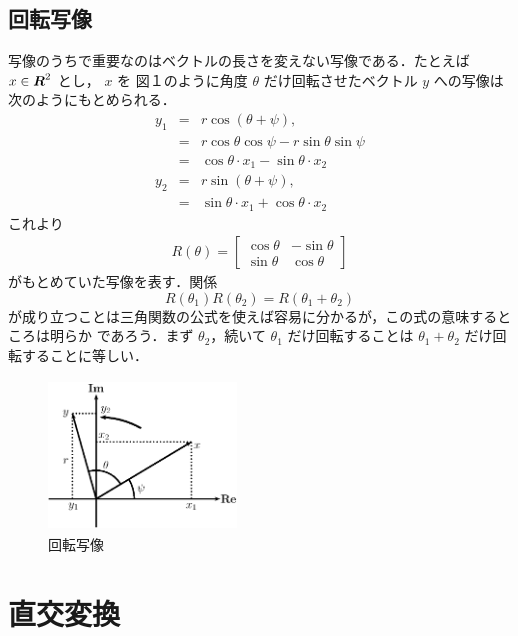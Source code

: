 \documentclass[a4paper,12pt]{jarticle}
\newcommand{\vect}[1]{\mbox{\boldmath${#1}$}}
\begin{document}
\subsection{回転写像}
写像のうちで重要なのはベクトルの長さを変えない写像である．たとえば $x \in \vect{R}^2$ とし， $x$ を
図１のように角度 $\theta$ だけ回転させたベクトル $y$ への写像は次のようにもとめられる．
\begin{eqnarray}
    y_1 &=&r\cos(\theta+\psi),\nonumber\\
    &=&r\cos\theta\cos\psi-r\sin\theta\sin\psi\nonumber\\
    &=&\cos\theta\cdot x_1 - \sin\theta\cdot x_2\nonumber\\
    y_2 &=&r\sin(\theta+\psi),\nonumber\\
    &=&\sin\theta\cdot x_1 + \cos\theta\cdot x_2\nonumber
\end{eqnarray}
これより
\begin{eqnarray}
    R(\theta)=
    \left[
        \begin{array}{lcr}
            \cos\theta & -\sin\theta \\
            \sin\theta & \cos\theta
        \end{array}
        \right]
    \label{eq2}
\end{eqnarray}
がもとめていた写像を表す．関係
$$R(\theta_1)R(\theta_2)=R(\theta_1+\theta_2)$$
が成り立つことは三角関数の公式を使えば容易に分かるが，この式の意味するところは明らか
であろう．まず $\theta_2$，続いて $\theta_1$ だけ回転することは $\theta_1+\theta_2$ だけ回転することに等しい．
\begin{figure}[t]
    \begin{center}
        \includegraphics[height=4cm,width=5cm]{FigRotation.eps}
    \end{center}
    \caption{回転写像}
\end{figure}

\section{直交変換}
\end{document}

